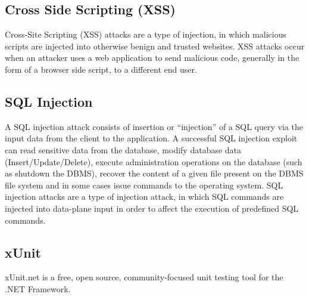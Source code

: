 \subsection*{Cross Side Scripting (XSS)}
Cross-Site Scripting (XSS) attacks are a type of injection, in which malicious scripts are injected into otherwise benign and trusted websites. XSS attacks occur when an attacker uses a web application to send malicious code, generally in the form of a browser side script, to a different end user.
\subsection*{SQL Injection}
A SQL injection attack consists of insertion or ``injection” of a SQL query via the input data from the client to the application. A successful SQL injection exploit can read sensitive data from the database, modify database data (Insert/Update/Delete), execute administration operations on the database (such as shutdown the DBMS), recover the content of a given file present on the DBMS file system and in some cases issue commands to the operating system. SQL injection attacks are a type of injection attack, in which SQL commands are injected into data-plane input in order to affect the execution of predefined SQL commands.
\subsection*{xUnit}
xUnit.net is a free, open source, community-focused unit testing tool for the .NET Framework. 

